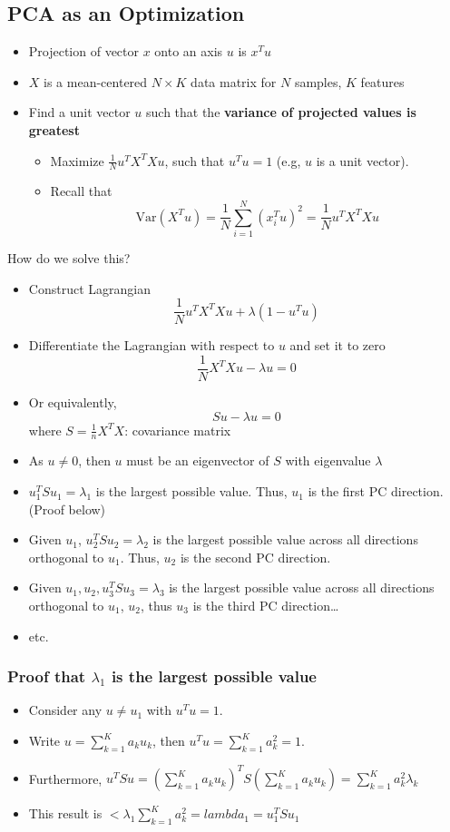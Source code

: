 \documentclass[10pt]{article}
\begin{document}
\subsection*{PCA as an Optimization}
\begin{itemize}
	\item Projection of vector $x$ onto an axis $u$ is $x^T u$
	\item $X$ is a mean-centered $N \times K$ data matrix for $N$ samples, $K$ features
	\item Find a unit vector $u$ such that the \textbf{variance of projected values is greatest}
	\begin{itemize}
	    \item Maximize $\frac{1}{N} u^T X^T Xu$, such that $u^T u = 1$  (e.g, $u$ is a unit vector).
	    \item Recall that
	    \[\text{Var}(X^T u) = \frac{1}{N} \sum_{i = 1}^N (x_i^T u)^2 = \frac{1}{N} u^T X^T Xu\]
    \end{itemize}
\end{itemize}
How do we solve this?
\begin{itemize}
	\item Construct Lagrangian
	\[\frac{1}{N} u^T X^T Xu + \lambda(1 - u^T u)\]
    \item Differentiate the Lagrangian with respect to $u$ and set it to zero
    \[\frac{1}{N} X^T Xu - \lambda u = 0\]
    \item Or equivalently,
    \[Su - \lambda u = 0\]
    where $S = \frac{1}{n} X^T X$: covariance matrix
    \item As $u \neq 0$, then $u$ must be an eigenvector of $S$ with eigenvalue $\lambda$
    \item $u_1^T Su_1 = \lambda_1$ is the largest possible value.  Thus, $u_1$ is the first PC direction.  (Proof below)
    \item Given $u_1$, $u_2^T Su_2 = \lambda_2$ is the largest possible value across all directions orthogonal to $u_1$.  Thus, $u_2$ is the second PC direction.
    \item Given $u_1, u_2, u_3^T Su_3 = \lambda_3$ is the largest possible value across all directions orthogonal to $u_1$, $u_2$, thus $u_3$ is the third PC direction\dots
    \item etc.
\end{itemize}

\subsubsection*{Proof that $\lambda_1$ is the largest possible value}
\begin{itemize}
	\item Consider any $u \neq u_1$ with $u^T u = 1$.
	\item Write $u = \sum_{k = 1}^K a_k u_k$, then $u^T u = \sum_{k = 1}^K a_k^2 = 1$.
	\item Furthermore, $u^T Su = \left(\sum_{k = 1}^K a_k u_k\right)^T S\left(\sum_{k = 1}^K a_k u_k\right) = \sum_{k= 1}^K a_k^2 \lambda_k$
	\item This result is $< \lambda_1 \sum_{k = 1}^K a_k^2 = lambda_1 = u_1^T Su_1$
\end{itemize} 
\end{document}
